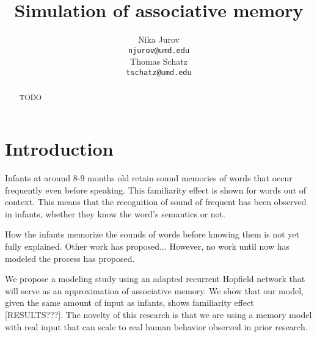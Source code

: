 \documentclass{article}
\title{Simulation of associative memory
}
\author{
  Nika Jurov \\
  \texttt{njurov@umd.edu} \\
   \And
  Thomas Schatz \\
  \texttt{tschatz@umd.edu} \\

}
\begin{document}
\maketitle


\begin{abstract}
TODO
\end{abstract}



\section{Introduction}









Infants at around 8-9 months old retain sound memories of words that occur frequently even before speaking. \cite{jusczyk1997infants} This familiarity effect is shown for words out of context. This means that the recognition of sound of frequent has been observed in infants, whether they know the word's semantics or not.

How the infants memorize the sounds of words before knowing them is not yet fully explained. Other work has proposed...
However, no work until now has modeled the process \cite{jusczyk1997infants} has proposed.

We propose a modeling study using an adapted recurrent Hopfield network that will serve as an approximation of associative memory. We show that our model, given the same amount of input as infants, shows familiarity effect [RESULTS???]. The novelty of this research is that we are using a memory model with real input that can scale to real human behavior observed in prior research.
\end{document}
